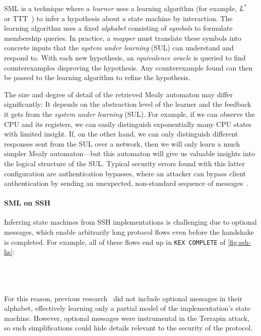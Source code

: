 SML is a technique where a \emph{learner} uses a learning algorithm (for example, $L^*$~\cite{angluin1987learning} or TTT~\cite{isberner2014ttt}) to infer a hypothesis about a state machine by interaction. The learning algorithm uses a fixed \emph{alphabet} consisting of \emph{symbols} to formulate membership queries. In practice, a \emph{mapper} must translate these symbols into concrete inputs that the \emph{system under learning} (SUL) can understand and respond to. With each new hypothesis, an \emph{equivalence oracle} is queried to find counterexamples disproving the hypothesis. Any counterexample found can then be passed to the learning algorithm to refine the hypothesis.

The size and degree of detail of the retrieved Mealy automaton may differ significantly: It depends on the abstraction level of the learner and the feedback it gets from the \emph{system under learning} (SUL). For example, if we can observe the CPU and its registers, we can easily distinguish exponentially many CPU states with limited insight. If, on the other hand, we can only distinguish different responses sent from the SUL over a network, then we will only learn a much simpler Mealy automaton---but this automaton will give us valuable insights into the logical structure of the SUL. Typical security errors found with this latter configuration are authentication bypasses, where an attacker can bypass client authentication by sending an unexpected, non-standard sequence of messages~\cite{USENIX:FJMRSS20}.

\paragraph{SML on SSH}

Inferring state machines from SSH implementations is challenging due to optional messages, which enable arbitrarily long protocol flows even before the handshake is completed. For example, all of these flows end up in \texttt{KEX COMPLETE} of \autoref{fig:ssh-hs}:

\\ 
\\
\\
For this reason, previous research~\cite{SPIN:fiterauSshModelChecking,tijssen2014automatic,NDSS:FJST23} did not include optional messages in their alphabet, effectively learning only a partial model of the implementation's state machine. However, optional messages were instrumental in the Terrapin attack, so such simplifications could hide details relevant to the security of the protocol.

